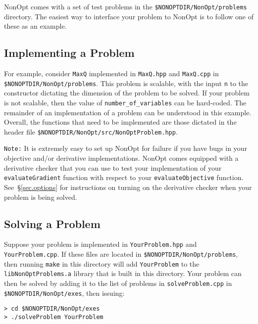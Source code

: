 \documentclass{article}
\begin{document}
NonOpt comes with a set of test problems in the \texttt{\$NONOPTDIR/NonOpt/problems} directory.  The easiest way to interface your problem to NonOpt is to follow one of these as an example.

\subsection{Implementing a Problem}

For example, consider \texttt{MaxQ} implemented in \texttt{MaxQ.hpp} and \texttt{MaxQ.cpp} in \texttt{\$NONOPTDIR/NonOpt/problems}.  This problem is scalable, with the input \texttt{n} to the constructor dictating the dimension of the problem to be solved.  If your problem is not scalable, then the value of \texttt{number\_of\_variables} can be hard-coded. The remainder of an implementation of a problem can be understood in this example.  Overall, the functions that need to be implemented are those dictated in the header file \texttt{\$NONOPTDIR/NonOpt/src/NonOptProblem.hpp}.

\texttt{Note:} It is extremely easy to set up NonOpt for failure if you have bugs in your objective and/or
derivative implementations.  NonOpt comes equipped with a derivative checker that you can use to test your
implementation of your \texttt{evaluateGradient} function with respect to your \texttt{evaluateObjective} function.  See~\S\ref{sec.options} for instructions on turning on the derivative checker when your problem is being solved.

\subsection{Solving a Problem}

Suppose your problem is implemented in \texttt{YourProblem.hpp} and \texttt{YourProblem.cpp}.  If these files are located in \texttt{\$NONOPTDIR/NonOpt/problems}, then running \texttt{make} in this directory will add \texttt{YourProblem} to the \texttt{libNonOptProblems.a} library that is built in this directory.  Your problem can then be solved by adding it to the list of problems in \texttt{solveProblem.cpp} in \texttt{\$NONOPTDIR/NonOpt/exes}, then issuing:

\begin{verbatim}
> cd $NONOPTDIR/NonOpt/exes
> ./solveProblem YourProblem
\end{verbatim}
\end{document}
